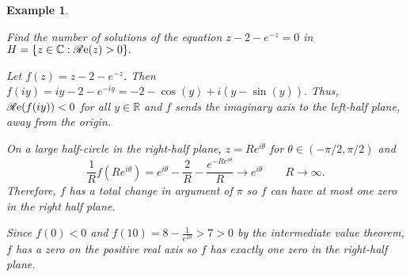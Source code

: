 \documentclass[12pt]{Qual}
\newtheorem{example}{Example}
\begin{document}
\begin{example}
$\,$
\begin{framed}
Find the number of solutions of the equation $z-2-e^{-z}=0$ in $H=\{z\in\mathbb{C}:\mathscr{R}\text{e}(z)>0\}.$
\end{framed}
Let $f(z)=z-2-e^{-z}$. Then $f(iy)=iy-2-e^{-iy}=-2-\cos(y)+i(y-\sin(y)).$
Thus, $\mathscr{R}\text{e}(f(iy))<0$ for all $y\in\mathbb{R}$ and $f$ sends the imaginary axis to the left-half plane, away from the origin.

On a large half-circle in the right-half plane, $z=Re^{i\theta}$ for $\theta\in(-\pi/2,\pi/2)$ and $$\frac{1}{R}f(Re^{i\theta})=e^{i\theta}-\frac{2}{R}-\frac{e^{-Re^{i\theta}}}{R}\to e^{i\theta}\qquad R\to\infty.$$ Therefore, $f$ has a total change in argument of $\pi$ so $f$ can have at most one zero in the right half plane.

Since $f(0)<0$ and $f(10)=8-\frac{1}{e^{10}}>7>0$ by the intermediate value theorem, $f$ has a zero on the positive real axis so $f$ has exactly one zero in the right-half plane.
\end{example}

\newpage
\end{document}
